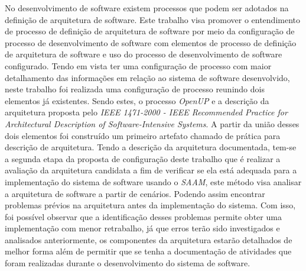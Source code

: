 No desenvolvimento de software existem processos que podem ser adotados na definição de arquitetura de software. Este trabalho visa promover o entendimento de processo de definição de arquitetura de software por meio da configuração de processo de desenvolvimento de software com elementos de processo de definição de arquitetura de software e uso do processo de desenvolvimento de software configurado. Tendo em vista ter uma configuração de processo com maior detalhamento das informações em relação ao sistema de software desenvolvido, neste trabalho foi realizada uma configuração de processo  reunindo dois elementos já existentes. Sendo estes, o processo  \emph{\acrfull{OpenUP}} e a descrição da arquitetura proposta pelo \emph{IEEE 1471-2000 - IEEE Recommended Practice for Architectural Description of Software-Intensive Systems}. A partir da união desses dois elementos foi construído um primeiro artefato chamado de  prática para descrição de arquitetura. Tendo a descrição da arquitetura documentada, tem-se a segunda etapa da proposta de configuração deste trabalho que é realizar a avaliação da arquitetura candidata a fim de verificar se ela está adequada para a implementação do sistema de software usando o \emph{\acrfull{SAAM}}, este método visa analisar a arquitetura de software a partir de cenários. Podendo assim encontrar problemas prévios na arquitetura antes da implementação do sistema. Com isso, foi possível observar que a identificação desses problemas permite obter uma implementação com menor retrabalho, já que erros terão sido investigados e analisados anteriormente, os componentes da arquitetura estarão detalhados de melhor forma além de permitir que se tenha a documentação de atividades que foram realizadas durante o desenvolvimento do sistema de software.